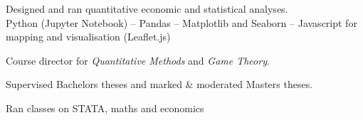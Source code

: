 \documentclass[a4paper,nomath]{deedy-resume} %
\begin{document}
\begin{paracol}{2}
\begin{tightitemize}
    \end{tightitemize}
    
    \sectionspace %


    \vspace{\topsep} %
    \begin{tightitemize}
        \item Designed and ran quantitative economic and statistical analyses.\\
        Python (Jupyter Notebook) -- Pandas -- Matplotlib and Seaborn -- Javascript for mapping and visualisation (Leaflet.js)
        
    \end{tightitemize}
    
    \sectionspace %


    \vspace{\topsep} %
    \begin{tightitemize}
        \item Course director for \textit{Quantitative Methods} and \textit{Game Theory}.
        \item Supervised Bachelors theses and marked \& moderated Masters theses.
        
    \end{tightitemize}
    
    \sectionspace %


    
    \begin{tightitemize}
        \item Ran classes on STATA, maths and economics
        
    \end{tightitemize}
    

\end{paracol}
\end{document}
